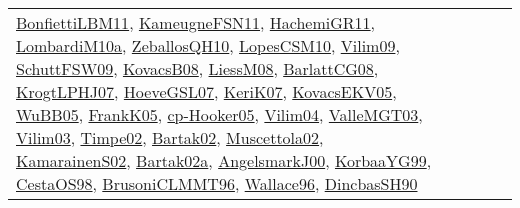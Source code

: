 {\begin{longtable}{lp{3cm}>{\raggedright}p{6cm}>{\raggedright}p{6cm}p{8cm}}
\href{papers/BonfiettiLBM11.pdf}{BonfiettiLBM11}\cite{BonfiettiLBM11}, \href{papers/KameugneFSN11.pdf}{KameugneFSN11}\cite{KameugneFSN11}, \href{articles/HachemiGR11.pdf}{HachemiGR11}\cite{HachemiGR11}, \href{articles/LombardiM10a.pdf}{LombardiM10a}\cite{LombardiM10a}, \href{articles/ZeballosQH10.pdf}{ZeballosQH10}\cite{ZeballosQH10}, \href{articles/LopesCSM10.pdf}{LopesCSM10}\cite{LopesCSM10}, \href{papers/Vilim09.pdf}{Vilim09}\cite{Vilim09}, \href{papers/SchuttFSW09.pdf}{SchuttFSW09}\cite{SchuttFSW09}, \href{articles/KovacsB08.pdf}{KovacsB08}\cite{KovacsB08}, \href{articles/LiessM08.pdf}{LiessM08}\cite{LiessM08}, \href{papers/BarlattCG08.pdf}{BarlattCG08}\cite{BarlattCG08}, \href{papers/KrogtLPHJ07.pdf}{KrogtLPHJ07}\cite{KrogtLPHJ07}, \href{papers/HoeveGSL07.pdf}{HoeveGSL07}\cite{HoeveGSL07}, \href{papers/KeriK07.pdf}{KeriK07}\cite{KeriK07}, \href{papers/KovacsEKV05.pdf}{KovacsEKV05}\cite{KovacsEKV05}, \href{papers/WuBB05.pdf}{WuBB05}\cite{WuBB05}, \href{papers/FrankK05.pdf}{FrankK05}\cite{FrankK05}, \href{papers/cp-Hooker05.pdf}{cp-Hooker05}\cite{cp-Hooker05}, \href{papers/Vilim04.pdf}{Vilim04}\cite{Vilim04}, \href{papers/ValleMGT03.pdf}{ValleMGT03}\cite{ValleMGT03}, \href{papers/Vilim03.pdf}{Vilim03}\cite{Vilim03}, \href{articles/Timpe02.pdf}{Timpe02}\cite{Timpe02}, \href{papers/Bartak02.pdf}{Bartak02}\cite{Bartak02}, \href{papers/Muscettola02.pdf}{Muscettola02}\cite{Muscettola02}, \href{papers/KamarainenS02.pdf}{KamarainenS02}\cite{KamarainenS02}, \href{papers/Bartak02a.pdf}{Bartak02a}\cite{Bartak02a}, \href{papers/AngelsmarkJ00.pdf}{AngelsmarkJ00}\cite{AngelsmarkJ00}, \href{papers/KorbaaYG99.pdf}{KorbaaYG99}\cite{KorbaaYG99}, \href{papers/CestaOS98.pdf}{CestaOS98}\cite{CestaOS98}, \href{papers/BrusoniCLMMT96.pdf}{BrusoniCLMMT96}\cite{BrusoniCLMMT96}, \href{articles/Wallace96.pdf}{Wallace96}\cite{Wallace96}, \href{articles/DincbasSH90.pdf}{DincbasSH90}\cite{DincbasSH90}\\

\end{longtable}}
